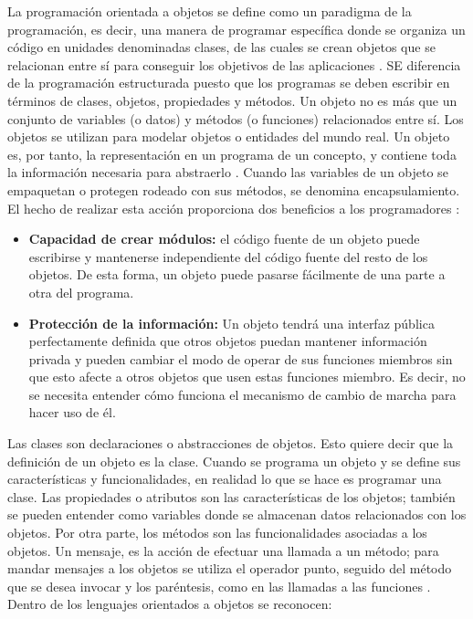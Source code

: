 La programación orientada a objetos se define como un paradigma de la programación, es decir, una manera de programar específica donde se organiza un código en unidades denominadas clases, de las cuales se crean objetos que se relacionan entre sí para conseguir los objetivos de las aplicaciones \parencite{alvarez2019}. SE diferencia de la programación estructurada puesto que los programas se deben escribir en términos de clases, objetos, propiedades y métodos.
Un objeto no es más que un conjunto de variables (o datos) y métodos (o funciones) relacionados entre sí. Los objetos se utilizan para modelar objetos o entidades del mundo real. Un objeto es, por tanto, la representación en un programa de un concepto, y contiene toda la información necesaria para abstraerlo \parencite{izquierdo2013}. Cuando las variables de un objeto se empaquetan o protegen rodeado con sus métodos, se denomina encapsulamiento. El hecho de realizar esta acción proporciona dos beneficios a los programadores \parencite{izquierdo2013}:
\begin{itemize}
\item \textbf{Capacidad de crear módulos:} el código fuente de un objeto puede escribirse y mantenerse independiente del código fuente del resto de los objetos. De esta forma, un objeto puede pasarse fácilmente de una parte a otra del programa.
\item \textbf{Protección de la información:} Un objeto tendrá una interfaz pública perfectamente definida que otros objetos puedan mantener información privada y pueden cambiar el modo de operar de sus funciones miembros sin que esto afecte a otros objetos que usen estas funciones miembro. Es decir, no se necesita entender cómo funciona el mecanismo de cambio de marcha para hacer uso de él. 
\end{itemize}

Las clases son declaraciones o abstracciones de objetos. Esto quiere decir que la definición de un objeto es la clase. Cuando se programa un objeto y se define sus características y funcionalidades, en realidad lo que se hace es programar una clase. Las propiedades o atributos son las características de los objetos; también se pueden entender como variables donde se almacenan datos relacionados con los objetos. Por otra parte, los métodos son las funcionalidades asociadas a los objetos. Un mensaje, es la acción de efectuar una llamada a un método; para mandar mensajes a los objetos se utiliza el operador punto, seguido del método que se desea invocar y los paréntesis, como en las llamadas a las funciones \parencite{alvarez2019}. Dentro de los lenguajes orientados a objetos se reconocen:

